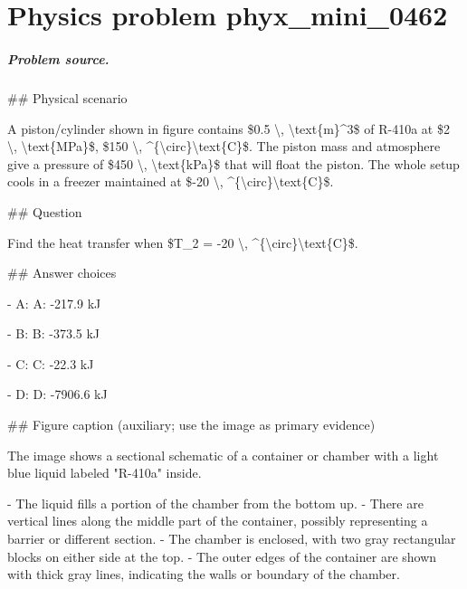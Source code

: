 
\chapter{Physics problem phyx\_mini\_0462}
\label{ch:PhyXMiniProblems_problem_phyx_mini_0462}

\paragraph{Problem source.}
\#\# Physical scenario

A piston/cylinder shown in figure contains \$0.5 \textbackslash{}, \textbackslash{}text\{m\}\textasciicircum{}3\$ of R-410a at \$2 \textbackslash{}, \textbackslash{}text\{MPa\}\$, \$150 \textbackslash{}, \textasciicircum{}\{\textbackslash{}circ\}\textbackslash{}text\{C\}\$. The piston mass and atmosphere give a pressure of \$450 \textbackslash{}, \textbackslash{}text\{kPa\}\$ that will float the piston. The whole setup cools in a freezer maintained at \$-20 \textbackslash{}, \textasciicircum{}\{\textbackslash{}circ\}\textbackslash{}text\{C\}\$.

\#\# Question

Find the heat transfer when \$T\_2 = -20 \textbackslash{}, \textasciicircum{}\{\textbackslash{}circ\}\textbackslash{}text\{C\}\$.

\#\# Answer choices

- A: A: -217.9 kJ

- B: B: -373.5 kJ

- C: C: -22.3 kJ

- D: D: -7906.6 kJ

\#\# Figure caption (auxiliary; use the image as primary evidence)

The image shows a sectional schematic of a container or chamber with a light blue liquid labeled "R-410a" inside. 

- The liquid fills a portion of the chamber from the bottom up.
- There are vertical lines along the middle part of the container, possibly representing a barrier or different section.
- The chamber is enclosed, with two gray rectangular blocks on either side at the top.
- The outer edges of the container are shown with thick gray lines, indicating the walls or boundary of the chamber.

